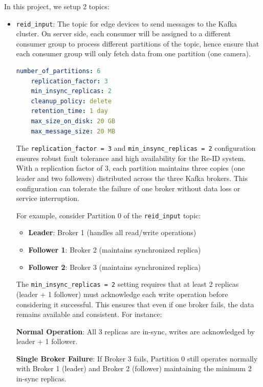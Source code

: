 \documentclass[../main.tex]{subfiles}
\begin{document}
In this project, we setup 2 topics:
\begin{itemize}
    \item \texttt{reid\_input}: The topic for edge devices to send messages to the Kafka cluster. On server side, each consumer will be assigned to a different consumer group to process different partitions of the topic, hence ensure that each consumer group will only fetch data from one partition (one camera). 
    
    \begin{lstlisting}[language=yaml, caption={Topic settings for \texttt{reid\_input}}]
    number_of_partitions: 6
    replication_factor: 3
    min_insync_replicas: 2
    cleanup_policy: delete
    retention_time: 1 day
    max_size_on_disk: 20 GB
    max_message_size: 20 MB
    \end{lstlisting}

    The \texttt{replication\_factor = 3} and \texttt{min\_insync\_replicas = 2} configuration ensures robust fault tolerance and high availability for the Re-ID system. With a replication factor of 3, each partition maintains three copies (one leader and two followers) distributed across the three Kafka brokers. This configuration can tolerate the failure of one broker without data loss or service interruption.
    
    For example, consider Partition 0 of the \texttt{reid\_input} topic:
    \begin{itemize}
        \item \textbf{Leader}: Broker 1 (handles all read/write operations)
        \item \textbf{Follower 1}: Broker 2 (maintains synchronized replica)
        \item \textbf{Follower 2}: Broker 3 (maintains synchronized replica)
    \end{itemize}
    
    The \texttt{min\_insync\_replicas = 2} setting requires that at least 2 replicas (leader + 1 follower) must acknowledge each write operation before considering it successful. This ensures that even if one broker fails, the data remains available and consistent. For instance:
    
    \textbf{Normal Operation}: All 3 replicas are in-sync, writes are acknowledged by leader + 1 follower.
    
    \textbf{Single Broker Failure}: If Broker 3 fails, Partition 0 still operates normally with Broker 1 (leader) and Broker 2 (follower) maintaining the minimum 2 in-sync replicas.
    

\end{itemize}
\end{document}
